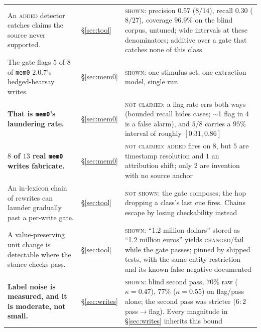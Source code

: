 \documentclass[11pt]{article}
\begin{document}
{\begin{longtable}{@{}L{0.46\textwidth} L{0.18\textwidth} L{0.28\textwidth}@{}}
An \textsc{added} detector catches claims the source never supported. &
\S\ref{sec:tool} & \textsc{shown}: precision $0.57$ ($8/14$), recall $0.30$ ($8/27$),
coverage $96.9\%$ on the blind corpus, untuned; wide intervals at these denominators;
additive over a gate that catches none of this class \\

The gate flags $5$ of $8$ of \texttt{mem0} $2.0.7$'s hedged-hearsay writes. &
\S\ref{sec:mem0} & \textsc{shown}: one stimulus set, one extraction model, single run \\

\textbf{That is \texttt{mem0}'s laundering rate.} & \S\ref{sec:mem0} &
\textsc{not claimed}: a flag rate errs both ways (bounded recall hides cases; $\sim$1
flag in 4 is a false alarm), and $5/8$ carries a $95\%$ interval of roughly
$[0.31, 0.86]$ \\

\textbf{$8$ of $13$ real \texttt{mem0} writes fabricate.} & \S\ref{sec:mem0} &
\textsc{not claimed}: \textsc{added} fires on $8$, but $5$ are timestamp resolution and
$1$ an attribution shift; only $2$ are invention with no source anchor \\

An in-lexicon chain of rewrites can launder gradually past a per-write gate. &
\S\ref{sec:tool} & \textsc{not shown}: the gate composes; the hop dropping a class's
last cue fires. Chains escape by losing checkability instead \\

A value-preserving unit change is detectable where the stance checks pass. &
\S\ref{sec:tool} & \textsc{shown}: ``1.2 million dollars'' stored as ``1.2 million
euros'' yields \textsc{changed}/fail while the gate passes; pinned by shipped tests,
with the same-entity restriction and its known false negative documented \\

\textbf{Label noise is measured, and it is moderate, not small.} & \S\ref{sec:writes} &
\textsc{shown}: blind second pass, $70\%$ raw ($\kappa=0.47$), $77\%$
($\kappa=0.55$) on flag/pass alone; the second pass was stricter ($6{:}2$
pass$\to$flag). Every magnitude in \S\ref{sec:writes} inherits this bound \\

\end{longtable}
}

\twocolumn
\end{document}

